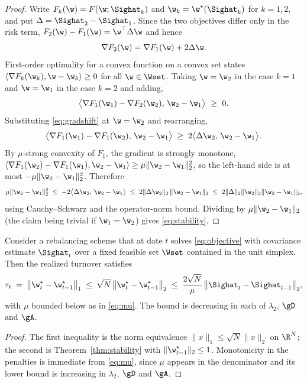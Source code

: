 \begin{proof}
Write $F_k(\w)=F(\w;\Sighat_k)$ and $\w_k=\w^\star(\Sighat_k)$ for $k=1,2$, and
put $\Delta=\Sighat_2-\Sighat_1$. Since the two objectives differ only in the
risk term, $F_2(\w)-F_1(\w)=\w^\top\Delta\w$ and hence
\begin{equation}
  \nabla F_2(\w)=\nabla F_1(\w)+2\Delta\w .
  \label{eq:gradshift}
\end{equation}
First-order optimality for a convex function on a convex set states
$\langle\nabla F_k(\w_k),\w-\w_k\rangle\ge0$ for all $\w\in\Wset$. Taking
$\w=\w_2$ in the case $k=1$ and $\w=\w_1$ in the case $k=2$ and adding,
\[
  \big\langle\nabla F_1(\w_1)-\nabla F_2(\w_2),\,\w_2-\w_1\big\rangle\ \ge\ 0 .
\]
Substituting \eqref{eq:gradshift} at $\w=\w_2$ and rearranging,
\[
  \big\langle\nabla F_1(\w_1)-\nabla F_1(\w_2),\,\w_2-\w_1\big\rangle
  \;\ge\;2\big\langle\Delta\w_2,\,\w_2-\w_1\big\rangle .
\]
By $\mu$-strong convexity of $F_1$, the gradient is strongly monotone,
$\langle\nabla F_1(\w_2)-\nabla F_1(\w_1),\w_2-\w_1\rangle\ge\mu\lVert\w_2-\w_1\rVert_2^2$,
so the left-hand side is at most $-\mu\lVert\w_2-\w_1\rVert_2^2$. Therefore
\[
  \mu\lVert\w_2-\w_1\rVert_2^2
  \;\le\;-2\big\langle\Delta\w_2,\,\w_2-\w_1\big\rangle
  \;\le\;2\lVert\Delta\w_2\rVert_2\,\lVert\w_2-\w_1\rVert_2
  \;\le\;2\lVert\Delta\rVert_2\lVert\w_2\rVert_2\lVert\w_2-\w_1\rVert_2 ,
\]
using Cauchy--Schwarz and the operator-norm bound. Dividing by
$\mu\lVert\w_2-\w_1\rVert_2$ (the claim being trivial if $\w_1=\w_2$) gives
\eqref{eq:stability}.
\end{proof}

\begin{corollary}
\label{cor:turnover}
Consider a rebalancing scheme that at date $t$ solves \eqref{eq:objective} with
covariance estimate $\Sighat_t$ over a fixed feasible set $\Wset$ contained in the
unit simplex. Then the realized turnover satisfies
\begin{equation}
  \tau_t\;=\;\big\lVert\w^\star_t-\w^\star_{t-1}\big\rVert_1
  \;\le\;\sqrt{N}\,\big\lVert\w^\star_t-\w^\star_{t-1}\big\rVert_2
  \;\le\;\frac{2\sqrt{N}}{\mu}\,\big\lVert\Sighat_t-\Sighat_{t-1}\big\rVert_2 ,
\end{equation}
with $\mu$ bounded below as in \eqref{eq:mu}. The bound is decreasing in each of
$\lambda_2$, $\gD$ and $\gA$.
\end{corollary}

\begin{proof}
The first inequality is the norm equivalence
$\lVert x\rVert_1\le\sqrt{N}\lVert x\rVert_2$ on $\R^{N}$; the second is
Theorem~\ref{thm:stability} with $\lVert\w^\star_{t-1}\rVert_2\le1$. Monotonicity
in the penalties is immediate from \eqref{eq:mu}, since $\mu$ appears in the
denominator and its lower bound is increasing in $\lambda_2$, $\gD$ and $\gA$.
\end{proof}

